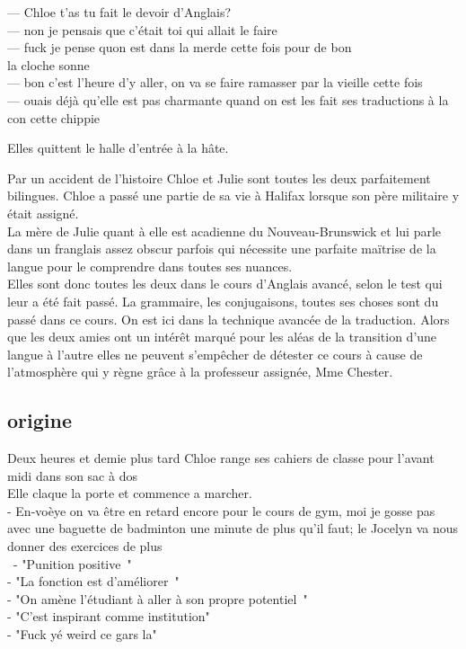 \documentclass{article}
\begin{document}
--- Chloe t’as tu fait le devoir d’Anglais?  \\
--- non je pensais que c'était toi qui allait le faire\\
--- fuck je pense quon est dans la merde cette fois pour de bon\\

la cloche sonne\\

--- bon c'est l'heure d'y aller, on va se faire ramasser par la vieille cette fois\\
--- ouais déjà qu'elle est pas charmante quand on est les fait ses traductions à la
con cette chippie

Elles quittent le halle d'entrée à la hâte.


Par un accident de l'histoire Chloe et Julie sont toutes les deux parfaitement
bilingues.  Chloe a passé une partie de sa vie à Halifax lorsque son père
militaire y était assigné.\\

La mère de Julie quant à elle est acadienne du
Nouveau-Brunswick et lui parle dans un franglais assez obscur parfois qui
nécessite une parfaite maïtrise de la langue pour le comprendre dans toutes ses
nuances.\\

Elles sont donc toutes les deux dans le cours d'Anglais avancé, selon le test
qui leur a été fait passé. La grammaire, les conjugaisons, toutes ses choses
sont du passé dans ce cours. On est ici dans la technique avancée de la
traduction. Alors que les deux amies ont un intérêt marqué pour les aléas de la
transition d'une langue à l'autre elles ne peuvent s'empêcher de détester ce
cours à cause de l'atmosphère qui y règne grâce à la professeur assignée, Mme
Chester.\\


\clearpage


\subsection{origine}

\clearpage

Deux heures et demie plus tard Chloe range ses cahiers de classe pour l’avant midi
dans son sac à dos \\
Elle claque la porte et commence a marcher.\\
- En-voèye on va être en retard encore pour le cours de gym, moi je gosse pas
avec une baguette de badminton une minute de plus qu’il faut; le Jocelyn va
nous donner des exercices de plus\\\
- "Punition positive "\\
- "La fonction est d’améliorer "\\
- "On amène l’étudiant à aller à son propre potentiel "\\
- "C’est inspirant comme institution"\\
- "Fuck yé weird ce gars la"\\
\end{document}
